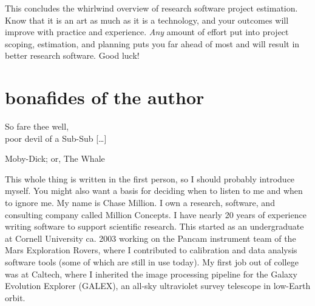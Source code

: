 \documentclass[12pt,oneside]{book}
\begin{document}
\vfill
This concludes the whirlwind overview of research software project estimation. Know that it is an art as much as it is a technology, and your outcomes will improve with practice and experience. \emph{Any} amount of effort put into project scoping, estimation, and planning puts you far ahead of most and will result in better research software. Good luck!
\hfill \break \hfill \break \hfill \break

\chapter*{bonafides of the author}
\label{scrivauto:52}

\label{scrivauto:53}

\epigraph{So fare thee well, \\poor devil of a Sub-Sub [{\dots}]}{Moby-Dick; or, The Whale} \hfill \break

\label{scrivauto:54}

This whole thing is written in the first person, so I should probably introduce myself. You might also want a basis for deciding when to listen to me and when to ignore me. My name is Chase Million. I own a research, software, and consulting company called Million Concepts. I have nearly 20 years of experience writing software to support scientific research. This started as an undergraduate at Cornell University ca. 2003 working on the Pancam instrument team of the Mars Exploration Rovers, where I contributed to calibration and data analysis software tools (some of which are still in use today). My first job out of college was at Caltech, where I inherited the image processing pipeline for the Galaxy Evolution Explorer (GALEX), an all-sky ultraviolet survey telescope in low-Earth orbit.
\end{document}
